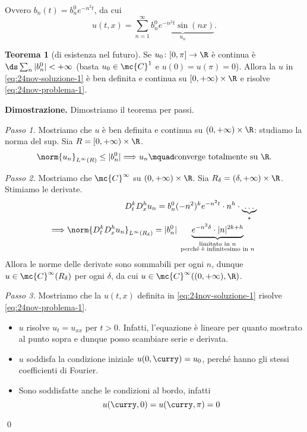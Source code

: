 Ovvero $b_n(t) = b_n^0 e^{-n^2 t}$, da cui  
\begin{equation}
\label{eq:24nov-soluzione-1} \tag{$\ast$}
	u(t,x) = \sum_{n=1}^\infty \underbrace{b_n^0 e^{-n^2t} \sin(nx)}_{u_n}.
\end{equation}


\textbf{Teorema 1} (di esistenza nel futuro).
Se $u_0 \colon [0,\pi] \to \R$ è continua è $\ds \sum_n |b_n^0| < +\infty$ (basta $u_0 \in \mc{C}^1$ e $u(0) = u(\pi) = 0$).
Allora la $u$ in \eqref{eq:24nov-soluzione-1} è ben definita e continua su $[0,+\infty) \times \R$ e risolve \eqref{eq:24nov-problema-1}.

\textbf{Dimostrazione.} Dimostriamo il teorema per passi.

\textit{Passo 1.}
Mostriamo che $u$ è ben definita e continua su $(0,+\infty) \times \R$: studiamo la norma del sup. Sia $R = [0, +\infty) \times \R$.
%
$$
	\norm{u_n}_{L^\infty(R)} \leq |b_n^0| \Longrightarrow u_n \mquad \text{converge totalmente su } \R.
$$
%

\textit{Passo 2.} Mostriamo che $\mc{C}^\infty$ su $(0,+\infty) \times \R$.
Sia $R_\delta = (\delta, +\infty) \times \R$.
Stimiamo le derivate.
\begin{align*}
	D_t^k D_x^h u_n = b_n^0 (-n^2)^k e^{-n^2t} \cdot n^h \cdot \underbrace{\ldots}_{\star} \\
	\Longrightarrow \norm{D_t^k D_x^h u_n}_{L^\infty(R_\delta)} 
	= |b_n^0| \underbrace{e^{-n^2\delta} \cdot |n|^{2k+h}}_{\substack{\text{limitato in $n$} \\ \text{ perché è infinitesimo in $n$ }}}
\end{align*}
Allora le norme delle derivate sono sommabili per ogni $n$, dunque $u \in \mc{C}^\infty(R_\delta)$ per ogni $\delta$, da cui $u \in \mc{C}^\infty( (0,+\infty),\R)$.

\textit{Passo 3.} Mostriamo che la $u(t,x)$ definita in \eqref{eq:24nov-soluzione-1} risolve \eqref{eq:24nov-problema-1}.
\begin{itemize}

	\item $u$ risolve $u_t = u_{xx}$ per $t > 0$.
	Infatti, l'equazione è lineare per quanto mostrato al punto sopra e dunque posso scambiare serie e derivata.


	\item $u$ soddisfa la condizione iniziale $u(0,\curry) = u_0$, perché hanno gli stessi coefficienti di Fourier.


	\item Sono soddisfatte anche le condizioni al bordo, infatti
	$$
	u(\curry,0) = u(\curry,\pi) = 0
	$$
\end{itemize}
\qed

